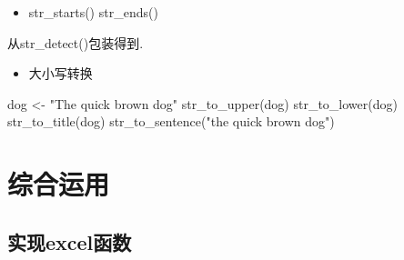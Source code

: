 \documentclass[
]{book}
\newenvironment{Shaded}{\begin{snugshade}}{\end{snugshade}}
\newcommand{\FunctionTok}[1]{\textcolor[rgb]{0.00,0.00,0.00}{#1}}
\newcommand{\NormalTok}[1]{#1}
\newcommand{\OtherTok}[1]{\textcolor[rgb]{0.56,0.35,0.01}{#1}}
\newcommand{\StringTok}[1]{\textcolor[rgb]{0.31,0.60,0.02}{#1}}
\providecommand{\tightlist}{%
  \setlength{\itemsep}{0pt}\setlength{\parskip}{0pt}}
\begin{document}
\begin{itemize}
\tightlist
\item
  str\_starts() str\_ends()
\end{itemize}

从str\_detect()包装得到.

\begin{Shaded}
\end{Shaded}

\begin{itemize}
\tightlist
\item
  大小写转换
\end{itemize}

\begin{Shaded}
\begin{Highlighting}[]
\NormalTok{dog }\OtherTok{\textless{}{-}} \StringTok{"The quick brown dog"}
\FunctionTok{str\_to\_upper}\NormalTok{(dog)}
\FunctionTok{str\_to\_lower}\NormalTok{(dog)}
\FunctionTok{str\_to\_title}\NormalTok{(dog)}
\FunctionTok{str\_to\_sentence}\NormalTok{(}\StringTok{"the quick brown dog"}\NormalTok{)}
\end{Highlighting}
\end{Shaded}

\hypertarget{character:application}{%
\section{综合运用}\label{character:application}}

\hypertarget{ux5b9eux73b0excelux51fdux6570}{%
\subsection{实现excel函数}\label{ux5b9eux73b0excelux51fdux6570}}
\end{document}
